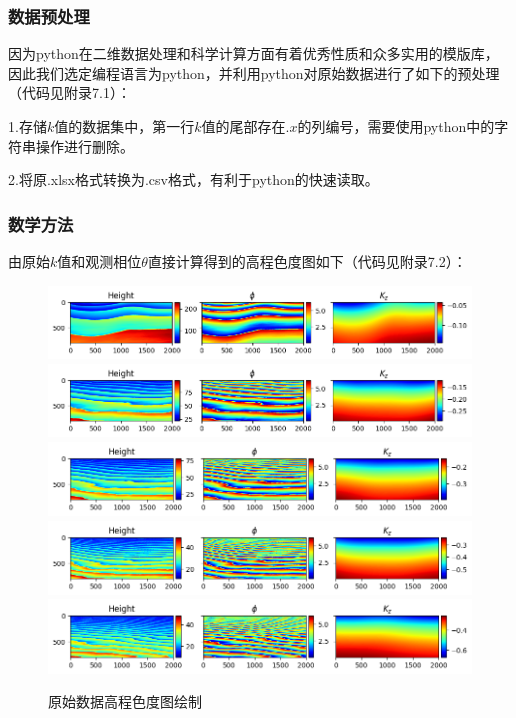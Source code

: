 \documentclass[a4paper]{article}
\begin{document}
	\subsubsection{数据预处理}

	因为python在二维数据处理和科学计算方面有着优秀性质和众多实用的模版库，因此我们选定编程语言为python，并利用python对原始数据进行了如下的预处理（代码见附录7.1）：\par
	1.存储$ k $值的数据集中，第一行$ k $值的尾部存在$ .x $的列编号，需要使用python中的字符串操作进行删除。\par
	2.将原.xlsx格式转换为.csv格式，有利于python的快速读取。

	\subsubsection{数学方法}

	由原始$ k $值和观测相位$ \theta $直接计算得到的高程色度图如下（代码见附录7.2）：\par
	
	\begin{figure}[H]
		\centering
		\includegraphics[width=1.01\textwidth]{images/raw/raw_1.png}
		\includegraphics[width=1.01\textwidth]{images/raw/raw_2.png}
		\includegraphics[width=1\textwidth]{images/raw/raw_3.png}
		\includegraphics[width=1\textwidth]{images/raw/raw_4.png}
		\includegraphics[width=1\textwidth]{images/raw/raw_5.png}
		
		\caption{原始数据高程色度图绘制}
		\label{fig:raw_1}
	\end{figure}
\end{document}
